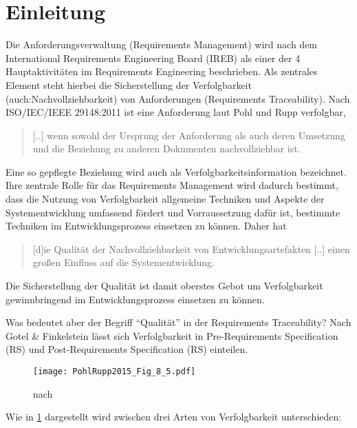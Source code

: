 \section{Einleitung}
Die Anforderungsverwaltung (Requirements Management) wird nach dem International Requirements Engineering Board (IREB)  als einer der 4 Hauptaktivitäten im Requirements Engineering beschrieben.
Als zentrales Element steht hierbei die Sicherstellung der Verfolgbarkeit (auch:Nachvollziehbarkeit) von Anforderungen (Requirements Traceability). \cite{Pohl2015BasiswissenIREB-Standard}
Nach ISO/IEC/IEEE 29148:2011 ist eine Anforderung laut Pohl und Rupp verfolgbar,
\begin{quote}
[..] wenn sowohl der Ursprung der Anforderung als auch deren Umsetzung und die Beziehung zu anderen Dokumenten nachvollziehbar ist. \cite[S.48]{Pohl2015BasiswissenIREB-Standard}
\end{quote}
Eine so gepflegte Beziehung wird auch als Verfolgbarkeitsinformation bezeichnet. Ihre zentrale Rolle für das Requirements Management wird dadurch bestimmt, dass die Nutzung von Verfolgbarkeit allgemeine Techniken und Aspekte der Systementwicklung umfassend fördert und Vorraussetzung dafür ist, bestimmte Techniken im Entwicklungsprozess einsetzen zu können. \cite{Pohl2008RequirementsTechniken} Daher hat 
\begin{quote}
[d]ie Qualität der Nachvollziehbarkeit von Entwicklungsartefakten [..] einen großen Einfluss auf die Systementwicklung. \cite[S.507]{Pohl2008RequirementsTechniken}
\end{quote}
Die Sicherstellung der Qualität ist damit oberstes Gebot um Verfolgbarkeit gewinnbringend im Entwicklungsprozess einsetzen zu können. 

Was bedeutet aber der Begriff \enquote{Qualität} in der Requirements Traceability? Nach Gotel \& Finkelstein lässt sich Verfolgbarkeit in Pre-Requirements Specification (RS) und Post-Requirements Specification (RS) einteilen. 

\begin{figure}[!htb]
  \centering
  \texttt{[image: PohlRupp2015\_Fig\_8\_5.pdf]}
  \caption{nach \cite[Fig. 8.5]{Pohl2015BasiswissenIREB-Standard}}
  \label{fig:abb1}
\end{figure}

Wie in \ref{fig:abb1} dargestellt wird zwischen drei Arten von Verfolgbarkeit unterschieden:

